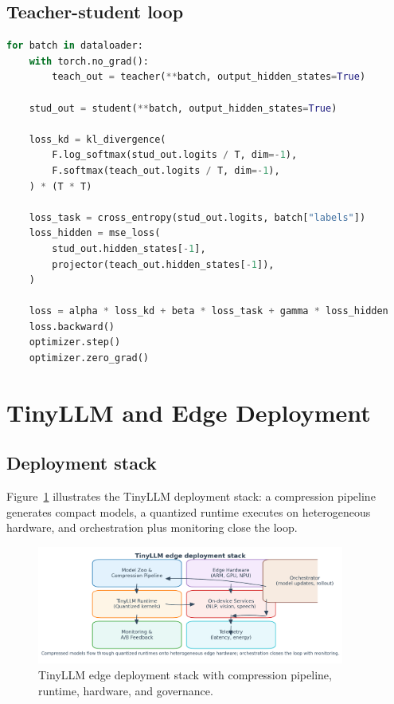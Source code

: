 \documentclass{article}
\begin{document}
\subsection{Teacher-student loop}
\begin{lstlisting}[language=Python,caption={Simplified knowledge distillation training loop}]
for batch in dataloader:
    with torch.no_grad():
        teach_out = teacher(**batch, output_hidden_states=True)

    stud_out = student(**batch, output_hidden_states=True)

    loss_kd = kl_divergence(
        F.log_softmax(stud_out.logits / T, dim=-1),
        F.softmax(teach_out.logits / T, dim=-1),
    ) * (T * T)

    loss_task = cross_entropy(stud_out.logits, batch["labels"])
    loss_hidden = mse_loss(
        stud_out.hidden_states[-1],
        projector(teach_out.hidden_states[-1]),
    )

    loss = alpha * loss_kd + beta * loss_task + gamma * loss_hidden
    loss.backward()
    optimizer.step()
    optimizer.zero_grad()
\end{lstlisting}

\section{TinyLLM and Edge Deployment}
\subsection{Deployment stack}
Figure~\ref{fig:tinyllm_edge_stack_en} illustrates the TinyLLM deployment stack: a compression pipeline generates compact models, a quantized runtime executes on heterogeneous hardware, and orchestration plus monitoring close the loop.
\begin{figure}[H]
  \centering
  \includegraphics[width=0.9\textwidth]{tinyllm_edge_stack.png}
  \caption{TinyLLM edge deployment stack with compression pipeline, runtime, hardware, and governance.}
  \label{fig:tinyllm_edge_stack_en}
\end{figure}
\end{document}
